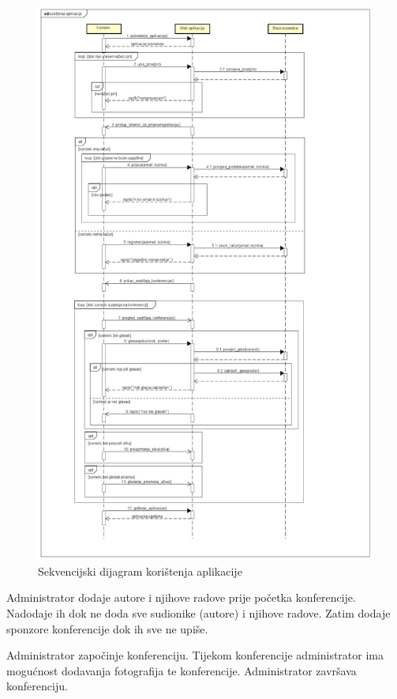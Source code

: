 				\begin{figure}[H]
					\includegraphics[scale=0.28]{dijagrami/koristenje_aplikacije.JPG} %
					\centering
					\caption{Sekvencijski dijagram korištenja aplikacije}
					\label{fig:promjene}
				\end{figure}

				Administrator dodaje autore i njihove radove prije početka konferencije. Nadodaje ih dok ne doda sve sudionike (autore) i njihove radove.
				Zatim dodaje sponzore konferencije dok ih sve ne upiše.

				Administrator započinje konferenciju. Tijekom konferencije administrator ima mogućnost dodavanja fotografija te konferencije. Administrator završava konferenciju. 

